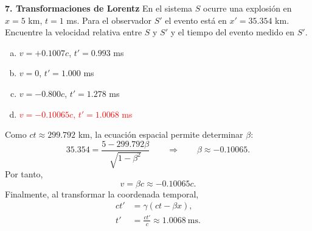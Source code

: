 \textbf{7. Transformaciones de Lorentz}
En el sistema $S$ ocurre una explosión en $x= 5$ km, $t= 1$ ms. Para el observador $S'$ el evento está en $x'= 35.354$ km. Encuentre la velocidad relativa entre $S$ y $S'$ y el tiempo del evento medido en $S'$.
\begin{enumerate}[a)]
    \item $v=+0.1007 c$, $t'= 0.993$ ms
    \item $v= 0$, $t'= 1.000$ ms
    \item $v= -0.800 c$, $t'= 1.278$ ms
    \item \textcolor{red}{$v= -0.10065 c$, $t'= 1.0068$ ms}
\end{enumerate}



Como $ct\approx299.792$ km, la ecuación espacial permite determinar $\beta$:
\[
35.354
=\frac{5-299.792\beta}{\sqrt{1-\beta^2}}
\qquad\Longrightarrow\qquad
\beta\approx-0.10065.
\]
Por tanto,
\[
v=\beta c\approx-0.10065c.
\]
Finalmente, al transformar la coordenada temporal,
\[
\begin{aligned}
ct'&=\gamma(ct-\beta x),\\
t'&=\frac{ct'}{c}\approx\boxed{1.0068\ \mathrm{ms}}.
\end{aligned}
\]
